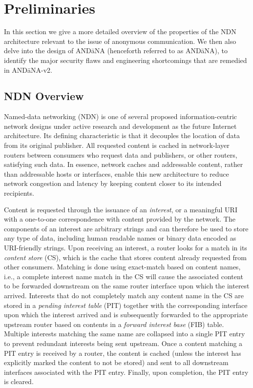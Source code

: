 \section{Preliminaries} \label{sec:preliminaries}
In this section we give a more detailed overview of the properties of the NDN architecture relevant to the issue of anonymous communication. We then also delve into the design of AND\=aNA (henceforth referred to as AND\=aNA), to identify the major security flaws and engineering shortcomings that are remedied in AND\=aNA-v2. 

\subsection{NDN Overview}
Named-data networking (NDN) is one of several proposed information-centric network designs under active research and development as the future Internet architecture. Its defining characteristic is that it decouples the location of data from its original publisher. All requested content is cached in network-layer routers between consumers who request data and publishers, or other routers, satisfying such data. In essence, network caches and addressable content, rather than addressable hosts or interfaces, enable this new architecture to reduce network congestion and latency by keeping content closer to its intended recipients. 

Content is requested through the issuance of an \emph{interest}, or a meaningful URI with a one-to-one correspondence with content provided by the network. The components of an interest are arbitrary strings and can therefore be used to store any type of data, including human readable names or binary data encoded as URI-friendly strings. Upon receiving an interest, a router looks for a match in its \emph{content store} (CS), which is the cache that stores content already requested from other consumers. Matching is done using exact-match based on content names, i.e., a complete interest name match in the CS will cause the associated content to be forwarded downstream on the same router interface upon which the interest arrived. Interests that do not completely match any content name in the CS are stored in a \emph{pending interest table} (PIT) together with the corresponding interface upon which the interest arrived and is subsequently forwarded to the appropriate upstream router based on contents in a \emph{forward interest base} (FIB) table. Multiple interests matching the same name are collapsed into a single PIT entry to prevent redundant interests being sent upstream. Once a content matching a PIT entry is received by a router, the content is cached (unless the interest has explicitly marked the content to not be stored) and sent to all downstream interfaces associated with the PIT entry. Finally, upon completion, the PIT entry is cleared.

